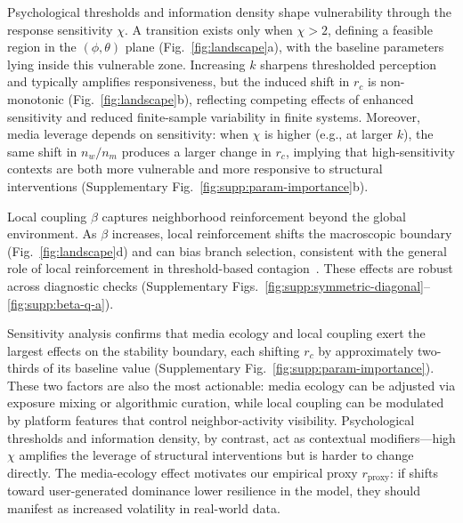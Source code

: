 \documentclass[12pt]{article}
\begin{document}
Psychological thresholds and information density shape vulnerability through the response sensitivity $\chi$. A transition exists only when $\chi>2$, defining a feasible region in the $(\phi,\theta)$ plane (Fig.~\ref{fig:landscape}a), with the baseline parameters lying inside this vulnerable zone. Increasing $k$ sharpens thresholded perception and typically amplifies responsiveness, but the induced shift in $r_c$ is non-monotonic (Fig.~\ref{fig:landscape}b), reflecting competing effects of enhanced sensitivity and reduced finite-sample variability in finite systems.
Moreover, media leverage depends on sensitivity: when $\chi$ is higher (e.g., at larger $k$), the same shift in $n_w/n_m$ produces a larger change in $r_c$, implying that high-sensitivity contexts are both more vulnerable and more responsive to structural interventions (Supplementary Fig.~\ref{fig:supp:param-importance}b).

Local coupling $\beta$ captures neighborhood reinforcement beyond the global environment. As $\beta$ increases, local reinforcement shifts the macroscopic boundary (Fig.~\ref{fig:landscape}d) and can bias branch selection, consistent with the general role of local reinforcement in threshold-based contagion~\cite{Granovetter1978,Centola2010,Iacopini2019}. These effects are robust across diagnostic checks (Supplementary Figs.~\ref{fig:supp:symmetric-diagonal}--\ref{fig:supp:beta-q-a}).

Sensitivity analysis confirms that media ecology and local coupling exert the largest effects on the stability boundary, each shifting $r_c$ by approximately two-thirds of its baseline value (Supplementary Fig.~\ref{fig:supp:param-importance}). These two factors are also the most actionable: media ecology can be adjusted via exposure mixing or algorithmic curation, while local coupling can be modulated by platform features that control neighbor-activity visibility. Psychological thresholds and information density, by contrast, act as contextual modifiers---high $\chi$ amplifies the leverage of structural interventions but is harder to change directly. The media-ecology effect motivates our empirical proxy $r_{\text{proxy}}$: if shifts toward user-generated dominance lower resilience in the model, they should manifest as increased volatility in real-world data.
\end{document}
